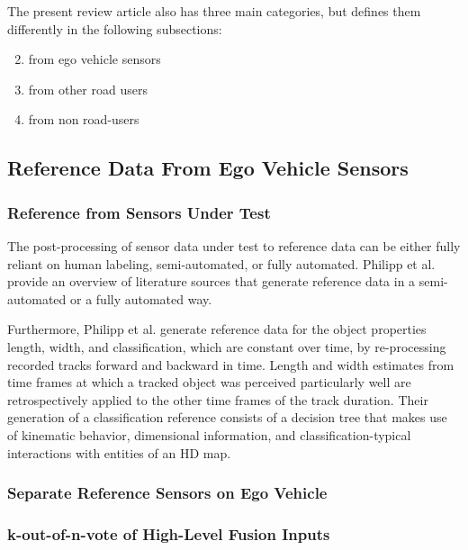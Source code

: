 \documentclass[conference]{IEEEtran}
\begin{document}
The present review article also has three main categories, but defines them differently in the following subsections:
\begin{enumerate}[A]\setcounter{enumi}{1}
\item from ego vehicle sensors
\item from other road users
\item from non road-users
\end{enumerate}


\subsection{Reference Data From Ego Vehicle Sensors}
\label{sec:data_from_ego}

\subsubsection{Reference from Sensors Under Test}

The post-processing of sensor data under test to reference data can be either fully reliant on human labeling, semi-automated, or fully automated. 
Philipp et al. \cite[Sec. II]{Philipp2021reference} provide an overview of literature sources that generate reference data in a semi-automated or a fully automated way. 

Furthermore, Philipp et al. \cite{Philipp2021reference} generate reference data for the object properties length, width, and classification, which are constant over time, by re-processing recorded tracks forward and backward in time.
Length and width estimates from time frames at which a tracked object was perceived particularly well are retrospectively applied to the other time frames of the track duration.
Their generation of a classification reference consists of a decision tree that makes use of kinematic behavior, dimensional information, and classification-typical interactions with entities of an HD map.


\subsubsection{Separate Reference Sensors on Ego Vehicle}

\subsubsection{k-out-of-n-vote of High-Level Fusion Inputs}
\label{sec:ref_data_k_out_of_n}
\end{document}
